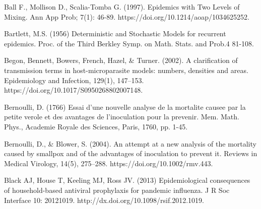

\begin{thebibliography}{99}
	
	
	
	 Ball F., Mollison D., Scalia-Tomba G. (1997). Epidemics with Two Levels of Mixing. Ann App Prob; 7(1): 46-89. https://doi.org/10.1214/aoap/1034625252.
	
	 Bartlett, M.S. (1956) Deterministic and Stochastic Models for recurrent epidemics. Proc. of the Third Berkley Symp. on Math. Stats. and Prob.4 81-108.
	
	
	
	Begon, Bennett, Bowers, French, Hazel, \& Turner. (2002). A clarification of transmission terms in host-microparasite models: numbers, densities and areas. Epidemiology and Infection, 129(1), 147–153. https://doi.org/10.1017/S0950268802007148.
	
	 Bernoulli, D. (1766) Essai d'une nouvelle analyse de la mortalite causee par la petite verole et des avantages de l'inoculation pour la prevenir. Mem. Math. Phys., Academie Royale des Sciences, Paris, 1760, pp. 1-45.
	
	 Bernoulli, D., \& Blower, S. (2004). An attempt at a new analysis of the mortality caused by smallpox and of the advantages of inoculation to prevent it. Reviews in Medical Virology, 14(5), 275–288. https://doi.org/10.1002/rmv.443.
	
	 Black AJ, House T, Keeling MJ, Ross JV. (2013) Epidemiological consequences of household-based antiviral prophylaxis for pandemic influenza. J R Soc Interface 10: 20121019. http://dx.doi.org/10.1098/rsif.2012.1019.
	

\end{thebibliography}

